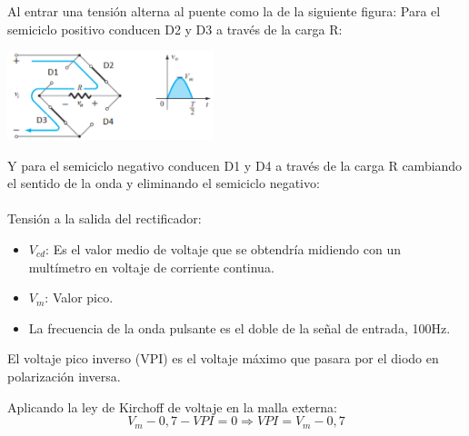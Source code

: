 \sangria{} Al entrar una tensión alterna al puente como la de la siguiente figura: 
\sangria{} Para el semiciclo positivo conducen D2 y D3 a través de la carga R:
\begin{center}
\includegraphics[width=6cm]{./imagenes/semic.png}
\end{center}
\sangria{} Y para el semiciclo negativo conducen D1 y D4 a través de la carga R cambiando el sentido de la onda y eliminando el semiciclo negativo:
\saltoPag{}
\paragraph{} Tensión a la salida del rectificador:

\begin{itemize}
    \item $V_{cd}$: Es el valor medio de voltaje que se obtendría midiendo con un multímetro en voltaje de corriente continua.
    \item $V_{m}$: Valor pico.
    \item La frecuencia de la onda pulsante es el doble de la señal de entrada, 100Hz.
\end{itemize}


\sangria{} El voltaje pico inverso (VPI) es el voltaje máximo que pasara por el diodo en polarización inversa. 

\sangria{} Aplicando la ley de Kirchoff de voltaje en la malla externa:
\begin{equation*}
    V_m - 0,7 - VPI = 0 \Rightarrow VPI = V_m - 0,7
\end{equation*}

